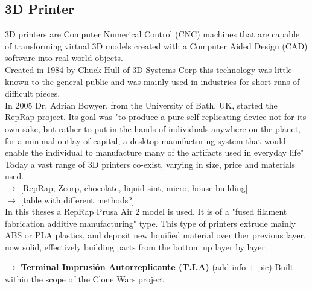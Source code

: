 \subsection{3D Printer}

	3D printers are Computer Numerical Control (CNC) machines that are capable of transforming virtual 3D models created with a Computer Aided Design (CAD) software into real-world objects.\\

	Created in 1984 by Chuck Hull of 3D Systems Corp this technology was little-known to the general public and was mainly used in industries for short runs of difficult pieces.\\
	In 2005 Dr. Adrian Bowyer, from the University of Bath, UK, started the RepRap project. Its goal was "to produce a pure self-replicating device not for its own sake, but rather to put in the hands of individuals anywhere on the planet, for a minimal outlay of capital, a desktop manufacturing system that would enable the individual to manufacture many of the artifacts used in everyday life" \\

	Today a vast range of 3D printers co-exist, varying in size, price and materials used. \\


	$\rightarrow$ [RepRap, Zcorp, chocolate, liquid sint, micro, house building]\\

	$\rightarrow$ [table with different methods?]\\

	In this theses a RepRap Prusa Air 2 model is used. It is of a "fused filament fabrication additive manufacturing" type. This type of printers extrude mainly ABS or PLA plastics, and deposit new liquified material over ther previous layer, now solid, effectively building parts from the bottom up layer by layer.

	$\rightarrow$ \textbf {Terminal Imprusión Autorreplicante (T.I.A) }
	(add info + pic)
	Built within the scope of the Clone Wars project
















